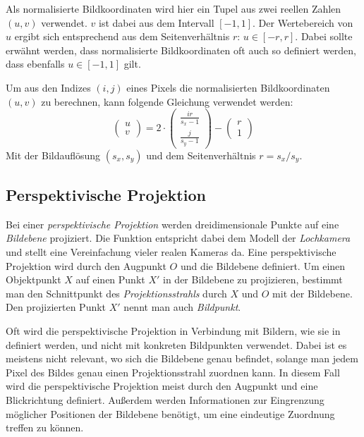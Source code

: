 \documentclass[ngerman,a4paper,parskip=half]{scrartcl}
\begin{document}
Als normalisierte Bildkoordinaten wird hier ein Tupel aus zwei reellen Zahlen $(u,v)$ verwendet. $v$ ist dabei aus dem Intervall $[-1,1]$. Der Wertebereich von $u$ ergibt sich entsprechend aus dem Seitenverhältnis $r$: $u \in [-r,r]$. Dabei sollte erwähnt werden, dass normalisierte Bildkoordinaten oft auch so definiert werden, dass ebenfalls $u \in [-1,1]$ gilt.

Um aus den Indizes $(i,j)$ eines Pixels die normalisierten Bildkoordinaten $(u,v)$ zu berechnen, kann folgende Gleichung verwendet werden:
\[ \begin{pmatrix}
u \\ v
\end{pmatrix} = 2 \cdot \begin{pmatrix}
\frac{i r}{s_x - 1} \\
\frac{j}{s_y - 1}
\end{pmatrix} - \begin{pmatrix}
r \\ 1
\end{pmatrix} \]
Mit der Bildauflösung $(s_x, s_y)$ und dem Seitenverhältnis $r = s_x/s_y$.

\subsection{Perspektivische Projektion}

Bei einer \emph{perspektivische Projektion} werden dreidimensionale Punkte auf eine \emph{Bildebene} projiziert. Die Funktion entspricht dabei dem Modell der \emph{Lochkamera} und stellt eine Vereinfachung vieler realen Kameras da. Eine perspektivische Projektion wird durch den Augpunkt $O$ und die Bildebene definiert. Um einen Objektpunkt $X$ auf einen Punkt $X'$ in der Bildebene zu projizieren, bestimmt man den Schnittpunkt des \emph{Projektionsstrahls} durch $X$ und $O$ mit der Bildebene. Den projizierten Punkt $X'$ nennt man auch \emph{Bildpunkt}.

Oft wird die perspektivische Projektion in Verbindung mit Bildern, wie sie in  definiert werden, und nicht mit konkreten Bildpunkten verwendet. Dabei ist es meistens nicht relevant, wo sich die Bildebene genau befindet, solange man jedem Pixel des Bildes genau einen Projektionsstrahl zuordnen kann. In diesem Fall wird die perspektivische Projektion meist durch den Augpunkt und eine Blickrichtung definiert. Außerdem werden Informationen zur Eingrenzung möglicher Positionen der Bildebene benötigt, um eine eindeutige Zuordnung treffen zu können.
\end{document}
